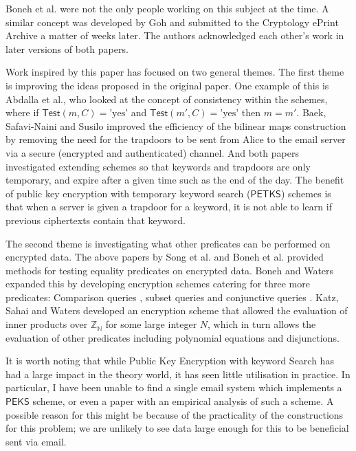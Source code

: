 \documentclass[a4paper,11pt]{article}
\begin{document}
    Boneh et al. were not the only people working on this subject at the time. A similar concept was developed by Goh\cite{cryptoeprint:2003:216} and submitted to the Cryptology ePrint Archive a matter of weeks later. The authors acknowledged each other's work in later versions of both papers.

    Work inspired by this paper has focused on two general themes. The first theme is improving the ideas proposed in the original paper. One example of this is Abdalla et al.\cite{abdalla:se-revisited}, who looked at the concept of consistency within the schemes, where if $\mathsf{Test}(m, C) = \text{'yes'}$ and $\mathsf{Test}(m', C) = \text{'yes'}$ then $m = m'$. Baek, Safavi-Naini and Susilo\cite{baek:se-revisited} improved the efficiency of the bilinear maps construction by removing the need for the trapdoors to be sent from Alice to the email server via a secure (encrypted and authenticated) channel. And both papers investigated extending schemes so that keywords and trapdoors are only temporary, and expire after a given time such as the end of the day. The benefit of public key encryption with temporary keyword search ($\mathsf{PETKS}$) schemes is that when a server is given a trapdoor for a keyword, it is not able to learn if previous ciphertexts contain that keyword.

    The second theme is investigating what other preficates can be performed on encrypted data. The above papers by Song et al. and Boneh et al. provided methods for testing equality predicates on encrypted data. Boneh and Waters\cite{boneh:predicate} expanded this by developing encryption schemes catering for three more predicates: Comparison queries , subset queries and conjunctive queries . Katz, Sahai and Waters\cite{katz:predicate} developed an encryption scheme that allowed the evaluation of inner products over $\mathbb{Z_N}$ for some large integer $N$, which in turn allows the evaluation of other predicates including polynomial equations and disjunctions.

    It is worth noting that while Public Key Encryption with keyword Search has had a large impact in the theory world, it has seen little utilisation in practice. In particular, I have been unable to find a single email system which implements a $\mathsf{PEKS}$ scheme, or even a paper with an empirical analysis of such a scheme. A possible reason for this might be because of the practicality of the constructions for this problem; we are unlikely to see data large enough for this to be beneficial sent via email.
\end{document}
